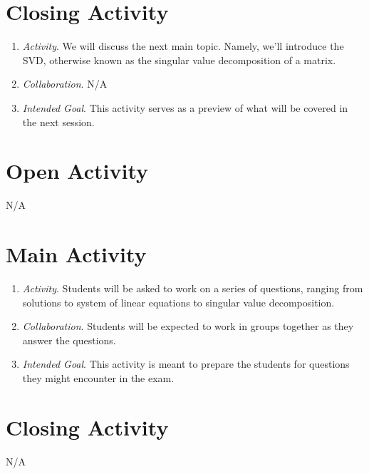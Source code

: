 \documentclass[11pt]{article}
\begin{document}
\section{\centering Closing Activity}
	\begin{enumerate}
		\item \textit{Activity}. We will discuss the next main topic. Namely, we'll introduce the SVD, otherwise known as the singular value decomposition
						of a matrix.
		\item \textit{Collaboration}. N/A
		\item \textit{Intended Goal}. This activity serves as a preview of what will be covered in the next session.
	\end{enumerate}

\newpage
{}
\section{\centering Open Activity}
	N/A

\section{\centering Main Activity}
	\begin{enumerate}
		\item \textit{Activity}. Students will be asked to work on a series of questions, ranging from solutions to system of linear equations to singular value
						decomposition.
		\item \textit{Collaboration}. Students will be expected to work in groups together as they answer the questions.
		\item \textit{Intended Goal}. This activity is meant to prepare the students for questions they might encounter in the exam.
	\end{enumerate}

\section{\centering Closing Activity}
	N/A
\end{document}
